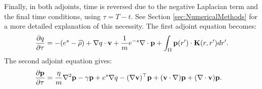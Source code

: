 Finally, in both adjoints, time is reversed due to the negative Laplacian term and the final time conditions, using $\tau = T-t$. See Section \ref{sec:NumericalMethods} for a more detailed explanation of this necessity.
The first adjoint equation becomes:
\begin{align*}
\frac{\partial q}{\partial \tau}  = - (e^s - \widehat {\rho})+ \nabla q \cdot \mathbf{v} +\frac{1}{m} e^{-s}\nabla \cdot \mathbf{p}  +  \int_\Omega  \mathbf{p}(r') \cdot\mathbf{K}(r,r')   dr' .
\end{align*}
The second adjoint equation gives:
\begin{align*}
&\frac{\partial \mathbf{p}}{\partial \tau} =   \frac{\eta}{m} \nabla^2 \mathbf{p}  - \gamma\mathbf{p} + e^s\nabla q -(\nabla \mathbf{v})^\top\mathbf{p} 
+ (\mathbf{v} \cdot \nabla)\mathbf{p} +  (\nabla \cdot \mathbf{v})\mathbf{p}  .
\end{align*}